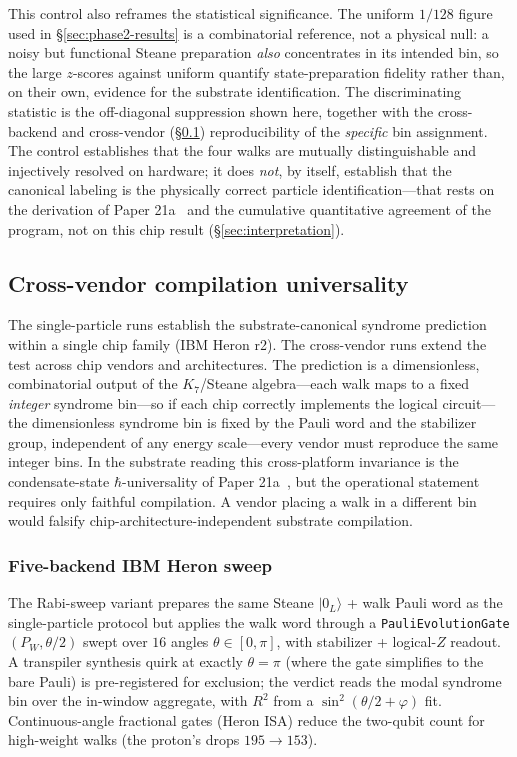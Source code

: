 \documentclass[11pt]{article}
\begin{document}
This control also reframes the statistical significance.  The uniform $1/128$ figure used in \S\ref{sec:phase2-results} is a combinatorial reference, not a physical null: a noisy but functional Steane preparation \emph{also} concentrates in its intended bin, so the large $z$-scores against uniform quantify state-preparation fidelity rather than, on their own, evidence for the substrate identification.  The discriminating statistic is the off-diagonal suppression shown here, together with the cross-backend and cross-vendor (\S\ref{sec:phase28e}) reproducibility of the \emph{specific} bin assignment.  The control establishes that the four walks are mutually distinguishable and injectively resolved on hardware; it does \emph{not}, by itself, establish that the canonical labeling is the physically correct particle identification---that rests on the derivation of Paper 21a~\cite{Paper21a} and the cumulative quantitative agreement of the program, not on this chip result (\S\ref{sec:interpretation}).

\subsection{Cross-vendor compilation universality}
\label{sec:phase28e}

The single-particle runs establish the substrate-canonical syndrome prediction within a single chip family (IBM Heron r2).  The cross-vendor runs extend the test across chip vendors and architectures.  The prediction is a dimensionless, combinatorial output of the $K_7$/Steane algebra---each walk maps to a fixed \emph{integer} syndrome bin---so if each chip correctly implements the logical circuit---the dimensionless syndrome bin is fixed by the Pauli word and the stabilizer group, independent of any energy scale---every vendor must reproduce the same integer bins.  In the substrate reading this cross-platform invariance is the condensate-state $\hbar$-universality of Paper 21a~\cite[\S 2.1, \S 5.4]{Paper21a}, but the operational statement requires only faithful compilation.  A vendor placing a walk in a different bin would falsify chip-architecture-independent substrate compilation.

\subsubsection{Five-backend IBM Heron sweep}
\label{sec:phase28e-heron}

The Rabi-sweep variant prepares the same Steane $|0_L\rangle$ + walk Pauli word as the single-particle protocol but applies the walk word through a \texttt{PauliEvolutionGate}$(P_W, \theta/2)$ swept over $16$ angles $\theta \in [0, \pi]$, with stabilizer + logical-$Z$ readout.  A transpiler synthesis quirk at exactly $\theta = \pi$ (where the gate simplifies to the bare Pauli) is pre-registered for exclusion; the verdict reads the modal syndrome bin over the in-window aggregate, with $R^2$ from a $\sin^2(\theta/2 + \varphi)$ fit.  Continuous-angle fractional gates (Heron ISA) reduce the two-qubit count for high-weight walks (the proton's drops $195 \to 153$).
\end{document}
